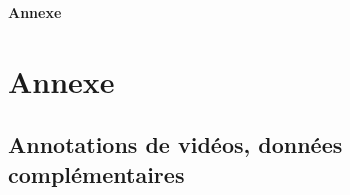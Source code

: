 
\begin{appendices}
\clearpage
\let\clearpage\relax
\vspace*{\fill}
\begin{center}
  \Huge\bfseries Annexe
\end{center}

\vspace*{\fill}
\chapter{Annexe}
\label{appendix:annexe}
\section{Annotations de vidéos, données complémentaires}


\end{appendices}
